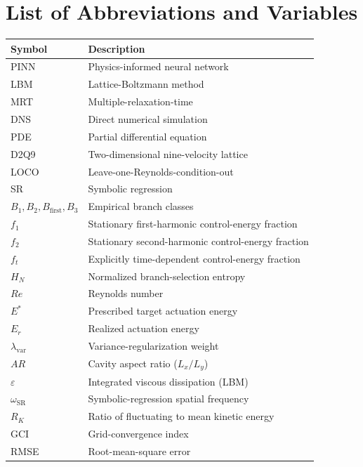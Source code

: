 \documentclass[a4paper,11pt]{article}
\begin{document}
\section*{List of Abbreviations and Variables}
\begin{table}[h]
\centering\small
\begin{tabular}{ll}
\toprule
\textbf{Symbol} & \textbf{Description}\\
\midrule
PINN & Physics-informed neural network\\
LBM  & Lattice-Boltzmann method\\
MRT  & Multiple-relaxation-time\\
DNS  & Direct numerical simulation\\
PDE  & Partial differential equation\\
D2Q9 & Two-dimensional nine-velocity lattice\\
LOCO & Leave-one-Reynolds-condition-out\\
SR   & Symbolic regression\\
\(B_1,B_2,B_{\mathrm{first}},B_3\) & Empirical branch classes\\
\(f_1\) & Stationary first-harmonic control-energy fraction\\
\(f_2\) & Stationary second-harmonic control-energy fraction\\
\(f_t\) & Explicitly time-dependent control-energy fraction\\
\(H_N\) & Normalized branch-selection entropy\\
\(Re\) & Reynolds number\\
\(E^*\) & Prescribed target actuation energy\\
\(E_r\) & Realized actuation energy\\
\(\lambda_{\mathrm{var}}\) & Variance-regularization weight\\
\(AR\) & Cavity aspect ratio (\(L_x/L_y\))\\
\(\varepsilon\) & Integrated viscous dissipation (LBM)\\
\(\omega_{\mathrm{SR}}\) & Symbolic-regression spatial frequency\\
\(R_K\) & Ratio of fluctuating to mean kinetic energy\\
GCI  & Grid-convergence index\\
RMSE & Root-mean-square error\\
\bottomrule
\end{tabular}
\end{table}
\end{document}
